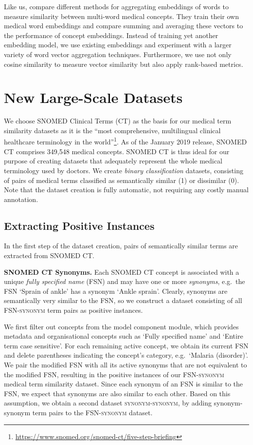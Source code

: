 \documentclass[letterpaper]{article} %
\newcommand{\lab}[1]{`#1'}
\newcommand{\dataset}[1]{\textsc{#1}}
\begin{document}
Like us, \citeauthor{HenryCM2018}  compare different methods for aggregating embeddings of words to measure similarity between multi-word medical concepts. They train their own medical word embeddings
and compare summing and averaging these vectors to the performance of concept embeddings.
Instead of training yet another embedding model, we use existing embeddings and experiment with a larger variety of word vector aggregation techniques. Furthermore, we use not only cosine similarity to measure vector similarity but also apply rank-based metrics.


\section{New Large-Scale Datasets}
We choose SNOMED Clinical Terms (CT) as the basis for our medical term similarity datasets as it is the ``most comprehensive, multilingual clinical healthcare terminology in the world''\footnote{\url{https://www.snomed.org/snomed-ct/five-step-briefing}}.
As of the January 2019 release, SNOMED CT comprises 349,548 medical concepts.
SNOMED CT is thus ideal for our purpose of creating datasets that adequately represent the whole medical terminology used by doctors.
We create \emph{binary classification} datasets, consisting of pairs of medical terms classified as semantically similar (1) or dissimilar (0).
Note that the dataset creation is fully automatic, not requiring any costly manual annotation.

\subsection{Extracting Positive Instances}
In the first step of the dataset creation, pairs of semantically similar terms are extracted from SNOMED CT.

\noindent\textbf{SNOMED CT Synonyms.}
Each SNOMED CT concept is associated with a unique \emph{fully specified name} (FSN) and may have one or more \emph{synonyms}, e.g.~the FSN \lab{Sprain of ankle} has a synonym \lab{Ankle sprain}.
Clearly, synonyms are semantically very similar to the FSN, so we construct a dataset consisting of all \dataset{FSN-synonym} term pairs as positive instances.

We first filter out
concepts from the model component module, which provides metadata and organisational concepts such as \lab{Fully specified name} and \lab{Entire term case sensitive}.
For each remaining active concept, we obtain its current FSN and delete parentheses indicating the concept's category, e.g.~\lab{Malaria (disorder)}. We pair the modified FSN with all its active synonyms that are not equivalent to the modified FSN, resulting in the positive instances of our \dataset{FSN-synonym} medical term similarity dataset.
Since each synonym of an FSN is similar to the FSN, we expect that synonyms are also similar to each other. Based on this assumption, we obtain a second dataset \dataset{synonym-synonym}, by adding synonym-synonym term pairs to the \dataset{FSN-synonym} dataset.
\end{document}

